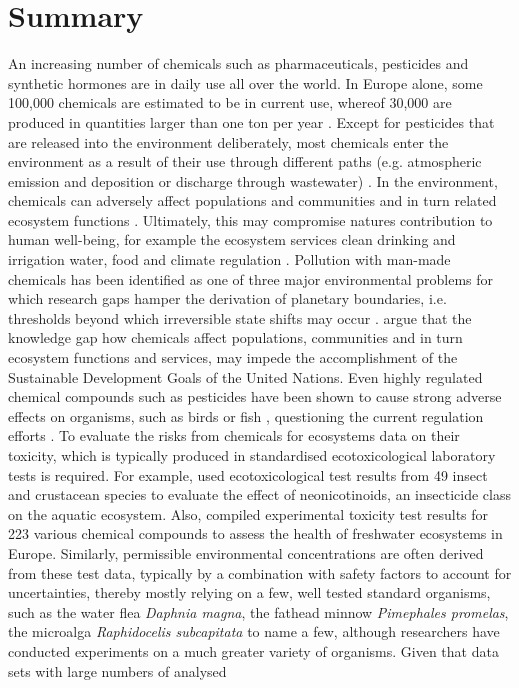 \section{Summary}
An increasing number of chemicals such as pharmaceuticals, pesticides and synthetic hormones are in daily use all over the world. In Europe alone, some 100,000 chemicals are estimated to be in current use, whereof 30,000 are produced in quantities larger than one ton per year \citep{breithaupt_costs_2006}. Except for pesticides that are released into the environment deliberately, most chemicals enter the environment as a result of their use through different paths (e.g. atmospheric emission and deposition or discharge through wastewater) \citep{schwarzenbach_challenge_2006}. In the environment, chemicals can adversely affect populations and communities and in turn related ecosystem functions \citep{rhind_anthropogenic_2009, clements_community_2009, hallmann_declines_2014, barracaracciolo_pharmaceuticals_2015, johnston_review_2015, hallmann_more_2017, sanchez-bayo_worldwide_2019}. Ultimately, this may compromise natures contribution to human well-being, for example the ecosystem services clean drinking and irrigation water, food and climate regulation \citep{peters_review_2013, vandersluijs_neonicotinoids_2013, barracaracciolo_pharmaceuticals_2015, yamamuro_neonicotinoids_2019}. Pollution with man-made chemicals has been identified as one of three major environmental problems for which research gaps hamper the derivation of planetary boundaries, i.e. thresholds beyond which irreversible state shifts may occur \citep{steffen_anthropocene_2007, steffen_planetary_2015}. \citet{bernhardt_synthetic_2017} argue that the knowledge gap how chemicals affect populations, communities and in turn ecosystem functions and services, may impede the accomplishment of the Sustainable Development Goals of the United Nations. Even highly regulated chemical compounds such as pesticides have been shown to cause strong adverse effects on organisms, such as birds \citep{hallmann_declines_2014} or fish \citep{yamamuro_neonicotinoids_2019}, questioning the current regulation efforts \citep{schafer_future_2019}. To evaluate the risks from chemicals for ecosystems data on their toxicity, which is typically produced in standardised ecotoxicological laboratory tests is required. For example, \citet{morrissey_neonicotinoid_2015} used ecotoxicological test results from 49 insect and crustacean species to evaluate the effect of neonicotinoids, an insecticide class on the aquatic ecosystem. Also, \citet{malaj_organic_2014} compiled experimental toxicity test results for 223 various chemical compounds to assess the health of freshwater ecosystems in Europe. Similarly, permissible environmental concentrations are often derived from these test data, typically by a combination with safety factors to account for uncertainties, thereby mostly relying on a few, well tested standard organisms, such as the water flea \textit{Daphnia magna}, the fathead minnow \textit{Pimephales promelas}, the microalga \textit{Raphidocelis subcapitata} to name a few, although researchers have conducted experiments on a much greater variety of organisms. Given that data sets with large numbers of analysed 